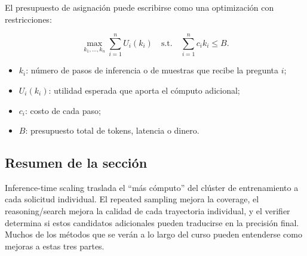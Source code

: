 El presupuesto de asignación puede escribirse como una optimización con restricciones:

$$
\max_{k_1,\ldots,k_n}\sum_{i=1}^{n} U_i(k_i)
\quad\text{s.t.}\quad
\sum_{i=1}^{n} c_i k_i\le B.
$$

\begin{itemize}
    \item $k_i$: número de pasos de inferencia o de muestras que recibe la pregunta $i$;
    \item $U_i(k_i)$: utilidad esperada que aporta el cómputo adicional;
    \item $c_i$: costo de cada paso;
    \item $B$: presupuesto total de tokens, latencia o dinero.
\end{itemize}

\subsection{Resumen de la sección}

Inference-time scaling traslada el ``más cómputo'' del clúster de entrenamiento a cada solicitud individual. El repeated sampling mejora la coverage, el reasoning/search mejora la calidad de cada trayectoria individual, y el verifier determina si estos candidatos adicionales pueden traducirse en la precisión final. Muchos de los métodos que se verán a lo largo del curso pueden entenderse como mejoras a estas tres partes.
